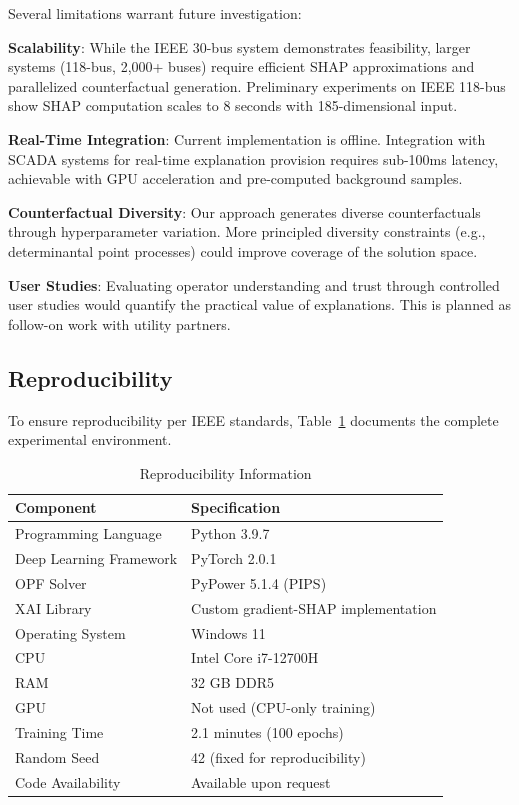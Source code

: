 \documentclass[journal,12pt,onecolumn]{IEEEtran}
\begin{document}
Several limitations warrant future investigation:

\textbf{Scalability}: While the IEEE 30-bus system demonstrates feasibility, larger systems (118-bus, 2,000+ buses) require efficient SHAP approximations and parallelized counterfactual generation. Preliminary experiments on IEEE 118-bus show SHAP computation scales to 8 seconds with 185-dimensional input.

\textbf{Real-Time Integration}: Current implementation is offline. Integration with SCADA systems for real-time explanation provision requires sub-100ms latency, achievable with GPU acceleration and pre-computed background samples.

\textbf{Counterfactual Diversity}: Our approach generates diverse counterfactuals through hyperparameter variation. More principled diversity constraints (e.g., determinantal point processes) could improve coverage of the solution space.

\textbf{User Studies}: Evaluating operator understanding and trust through controlled user studies would quantify the practical value of explanations. This is planned as follow-on work with utility partners.

\subsection{Reproducibility}

To ensure reproducibility per IEEE standards, Table~\ref{tab:repro} documents the complete experimental environment.

\begin{table}[htbp]
\caption{Reproducibility Information}
\label{tab:repro}
\centering
\begin{tabular}{ll}
\toprule
\textbf{Component} & \textbf{Specification} \\
\midrule
Programming Language & Python 3.9.7 \\
Deep Learning Framework & PyTorch 2.0.1 \\
OPF Solver & PyPower 5.1.4 (PIPS) \\
XAI Library & Custom gradient-SHAP implementation \\
Operating System & Windows 11 \\
CPU & Intel Core i7-12700H \\
RAM & 32 GB DDR5 \\
GPU & Not used (CPU-only training) \\
Training Time & 2.1 minutes (100 epochs) \\
Random Seed & 42 (fixed for reproducibility) \\
Code Availability & Available upon request \\
\bottomrule
\end{tabular}
\end{table}
\end{document}
